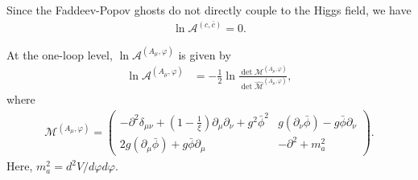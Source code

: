 \documentclass[12pt]{article}
\begin{document}
Since the Faddeev-Popov ghosts do not directly couple to the Higgs
field, we have
\begin{align}
 \ln \mathcal A^{(c,\bar{c})} = 0.
\end{align}

At the one-loop level, $\ln\mathcal A^{(A_\mu,\varphi)}$ is given by
\begin{align}
  \ln\mathcal A^{(A_\mu,\varphi)}
  & = 
  - \frac{1}{2}
  \ln
  \frac{\det\mathcal M^{(A_\mu,\varphi)}}
  {\det\widehat{\mathcal M}^{(A_\mu,\varphi)}},
\end{align}
where
\begin{align}
 \mathcal M^{(A_\mu,\varphi)} =
 \begin{pmatrix}
  -\partial^2\delta_{\mu\nu}+
  \left(
   1-\frac{1}{\xi}
  \right)\partial_\mu\partial_\nu+g^2\bar\phi^2
   & g(\partial_\nu\bar\phi)-g\bar\phi\partial_\nu \\
  2g(\partial_\mu\bar\phi)+g\bar\phi\partial_\mu
   & -\partial^2+m_{a}^2
 \end{pmatrix}.
 \label{eq_gaugeFluct}
\end{align}
Here, $m_{a}^2 = d^2V/d\varphi d\varphi$.

\end{document}
